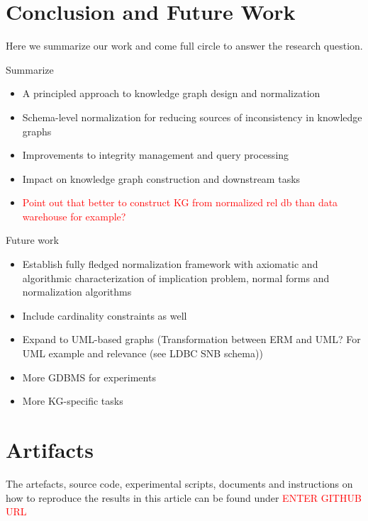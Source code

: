 \documentclass[sigconf]{acmart}
\begin{document}
\section{Conclusion and Future Work}\label{sec:conclusion}

Here we summarize our work and come full circle to answer the research question.

Summarize
\begin{itemize}
    \item A principled approach to knowledge graph design and normalization
    \item Schema-level normalization for reducing sources of inconsistency in knowledge graphs
    \item Improvements to integrity management and query processing
    \item Impact on knowledge graph construction and downstream tasks
    \item \textcolor{red}{Point out that better to construct KG from normalized rel db than data warehouse for example?}
\end{itemize}

Future work
\begin{itemize}
    \item Establish fully fledged normalization framework with axiomatic and algorithmic characterization of implication problem, normal forms and normalization algorithms
    \item Include cardinality constraints as well
    \item Expand to UML-based graphs (Transformation between ERM and UML? For UML example and relevance (see LDBC SNB schema))
    \item More GDBMS for experiments
    \item More KG-specific tasks
\end{itemize}




\section*{Artifacts}

The artefacts, source code, experimental scripts, documents and instructions on how to reproduce the results in this article can be found under \textcolor{red}{ENTER GITHUB URL}







\end{document}
